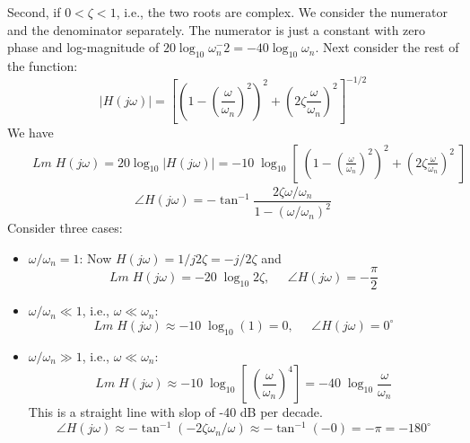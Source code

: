 \documentclass{article}
\begin{document}
\begin{enumerate}
  Second, if $0<\zeta<1$, i.e., the two roots are complex. We consider the numerator 
  and the denominator separately. The numerator is just a constant with zero phase and
  log-magnitude of $20\log_{10} \omega_n^{-}2=-40\log_{10} \omega_n$. Next consider the
  rest of the function:
  \begin{equation} 
    |H(j\omega)|=[(1-(\frac{\omega}{\omega_n})^2)^2+(2\zeta\frac{\omega}{\omega_n})^2]^{-1/2
  }\end{equation}
  We have
  \begin{eqnarray}
    && Lm\;H(j\omega)=20\log_{10} |H(j\omega)|
    =-10\;\log_{10}[\; (1-(\frac{\omega}{\omega_n})^2)^2+(2\zeta\frac{\omega}{\omega_n})^2\;]
  \end{eqnarray}
  \begin{equation} 
    \angle H(j\omega)=-\tan^{-1}\frac{2\zeta\omega/\omega_n}{1-(\omega/\omega_n)^2} 
  \end{equation}
  Consider three cases:
  \begin{itemize}
  \item $\omega/\omega_n=1$:
    Now $H(j\omega)=1/j2\zeta=-j/2\zeta$ and 
    \begin{equation} 
      Lm\;H(j\omega)=-20\;\log_{10} 2\zeta,\;\;\;\;\;\angle H(j\omega)=-\frac{\pi}{2}
    \end{equation}
  \item $\omega/\omega_n\ll 1$, i.e., $\omega \ll \omega_n$:
    \begin{equation}
      Lm\;H(j\omega) \approx -10\;\log_{10} (1)=0,\;\;\;\;\;\angle H(j\omega)=0^\circ 
    \end{equation}
  \item $\omega/\omega_n\gg 1$, i.e., $\omega \ll \omega_n$:
    \begin{equation}
      Lm\;H(j\omega)\approx-10\;\log_{10}[\; (\frac{\omega}{\omega_n})^4 ]
      =-40 \;\log_{10} \frac{\omega}{\omega_n}    
    \end{equation}
    This is a straight line with slop of -40 dB per decade.
    \begin{equation} 
      \angle H(j\omega) \approx -\tan^{-1} (-2\zeta \omega_n/\omega)
      \approx -\tan^{-1} (-0)=-\pi=-180^\circ 
    \end{equation}
  \end{itemize}

\end{enumerate}

\end{document}
